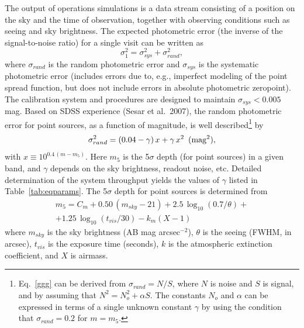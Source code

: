 The output of operations simulations is a data stream consisting of
a position on the sky and the time of observation, together with
observing conditions such as seeing and sky brightness. The expected
photometric error (the inverse of the signal-to-noise ratio) for a single visit
can be written as
\begin{equation}
         \sigma_1^2 = \sigma_{sys}^2 + \sigma_{rand}^2,
\end{equation}
where $\sigma_{rand}$ is the random photometric error and $\sigma_{sys}$ is
the systematic photometric error (includes errors due to, e.g., imperfect
modeling of the point spread function, but does not include errors in
absolute photometric zeropoint). The calibration system and procedures
are designed to maintain $\sigma_{sys}<0.005$ mag. Based on
SDSS experience (Sesar et al.~2007), the random photometric error for
point sources, as
a function of magnitude, is well described\footnote{Eq.~\ref{ggg} can
be derived from $\sigma_{rand}=N/S$, where $N$ is noise and $S$ is signal,
and by assuming that $N^2 = N_o^2 + \alpha S$. The constants $N_o$ and
$\alpha$ can be expressed in terms of a single unknown constant $\gamma$
by using the condition that $\sigma_{rand}=0.2$ for $m=m_5$.} by
\begin{equation}
\label{ggg}
  \sigma_{rand}^2 = (0.04-\gamma)\, x + \gamma \, x^2 \,\,\, {\rm (mag^2),}
\end{equation}
with $x \equiv 10^{0.4\,(m-m_5)}$. Here $m_5$ is the 5$\sigma$ depth (for
point sources) in a given band, and $\gamma$ depends on the sky
brightness, readout noise, etc.
Detailed determination of the system throughput yields the values of $\gamma$
listed in Table~\ref{tab:eqparams}. The 5$\sigma$ depth for point sources is determined from
\begin{eqnarray}
\label{m5}
  m_5 = C_m + 0.50\,(m_{sky}-21) + 2.5\,\log_{10}(0.7/\theta) +  \nonumber \\
        + 1.25\,\log_{10}(t_{vis}/30) - k_m(X-1) \phantom{xxxxx}
\end{eqnarray}
where $m_{sky}$ is the sky brightness (AB mag arcsec$^{-2}$), $\theta$ is
the seeing (FWHM, in arcsec), $t_{vis}$ is the exposure time (seconds),
$k$ is the atmospheric extinction coefficient, and $X$ is airmass.


